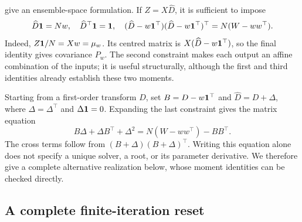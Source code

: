 \citet[Definition 3.1 and Sections 4--6]{acevedodewiljesreich2017secondorder} give an ensemble-space
formulation. If \(Z=X\widehat D\), it is sufficient to impose
\begin{equation}
\label{eq:bf-covariance-proposal-transform-constraints}
 \widehat D\mathbf 1=Nw,\quad
 \widehat D^\top\mathbf 1=\mathbf 1,\quad
 (\widehat D-w\mathbf 1^\top)(\widehat D-w\mathbf 1^\top)^\top
       =N(W-ww^\top).
\end{equation}
Indeed, \(Z\mathbf 1/N=Xw=\mu_w\). Its centred matrix is
\(X(\widehat D-w\mathbf 1^\top)\), so the final identity gives covariance \(P_w\).
The second constraint makes each output an affine combination of the inputs;
it is useful structurally, although the first and third identities already
establish these two moments.

Starting from a first-order transform \(D\), set \(B=D-w\mathbf 1^\top\) and
\(\widehat D=D+\Delta\), where \(\Delta=\Delta^\top\) and
\(\Delta\mathbf 1=0\). Expanding the last constraint gives the matrix equation
\begin{equation}
\label{eq:bf-covariance-proposal-riccati-correction}
 B\Delta+\Delta B^\top+\Delta^2
   =N(W-ww^\top)-BB^\top.
\end{equation}
The cross terms follow from \((B+\Delta)(B+\Delta)^\top\).
Writing this equation alone does not specify a unique solver, a root,
or its parameter derivative. We therefore give a complete alternative
realization below, whose moment identities can be checked directly.

\subsection{A complete finite-iteration reset}

